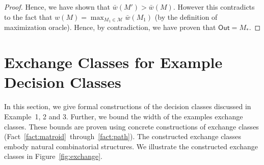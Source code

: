 \documentclass{article}
\newcommand{\M}{\mathcal M}
\newcommand{\out}{\mathsf{Out}}
\begin{document}
\begin{proof}
Hence, we have shown that $\bar w(M') > \bar w(M)$. 
However this contradicts to the fact that $w(M)=\max_{M_1\in \M} \bar w(M_1)$ (by the definition of maximization oracle). 
Hence, by contradiction, we have proven that $\out=M_*$.
\end{proof}



\section{Exchange Classes for Example Decision Classes}
\label{section:exchange-proof}

In this section, we give formal constructions of the decision classes discussed in Example~1, 2 and 3.
Further, we bound the width of the examples exchange classes.
These bounds are proven using concrete constructions of exchange classes (Fact~\ref{fact:matroid}~through~\ref{fact:path}).
The constructed exchange classes embody natural combinatorial structures.
We illustrate the constructed exchange classes in Figure~\ref{fig:exchange}.
\end{document}
